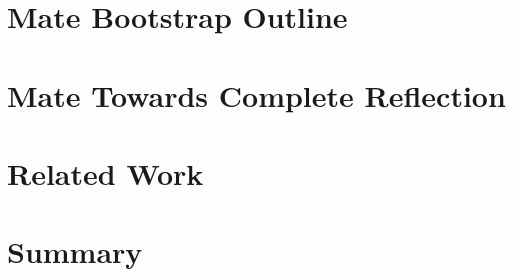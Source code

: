\section{Mate Bootstrap Outline}



\section{Mate Towards Complete Reflection}


\section{Related Work}


\section{Summary}


